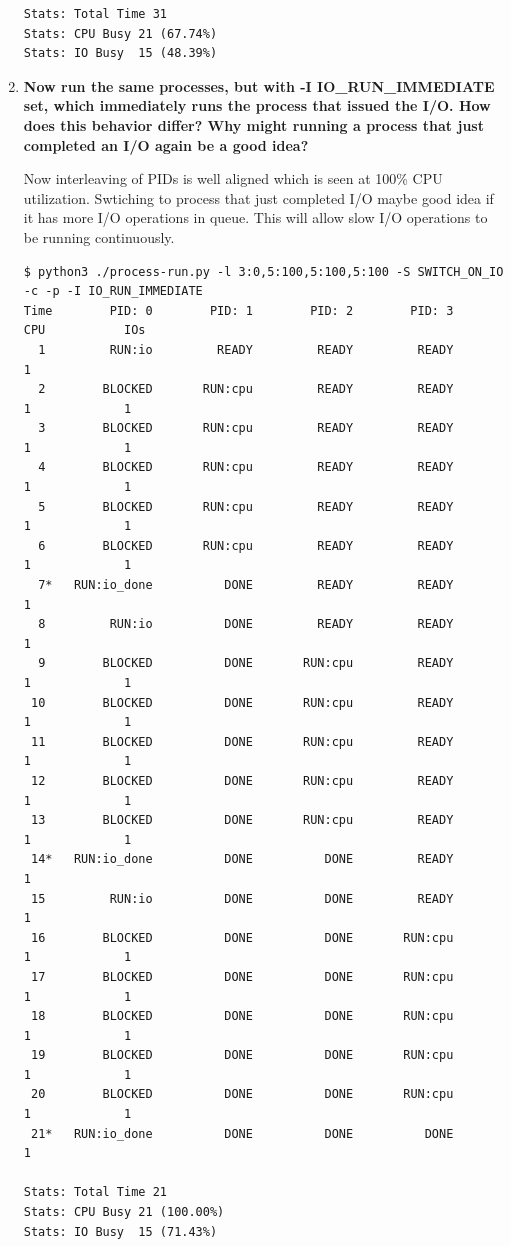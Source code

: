 \documentclass{article}
\begin{document}
\begin{enumerate}[label=\textbf{\arabic*}), start=3]
{\begin{verbatim}
Stats: Total Time 31
Stats: CPU Busy 21 (67.74%)
Stats: IO Busy  15 (48.39%)
    \end{verbatim}
    }
\pagebreak
    \item 
    {\bf Now run the same processes, but with
    -I IO\_RUN\_IMMEDIATE set, which immediately runs
    the process that issued the I/O. How does this behavior
    differ? Why might running a process that just completed
    an I/O again be a good idea?}

    Now interleaving of PIDs is well aligned which is seen at 100\% CPU
    utilization. Swtiching to process that just completed I/O maybe good
    idea if it has more I/O operations in queue. This will allow slow I/O
    operations to be running continuously.


{\scriptsize
\begin{verbatim}
$ python3 ./process-run.py -l 3:0,5:100,5:100,5:100 -S SWITCH_ON_IO -c -p -I IO_RUN_IMMEDIATE
Time        PID: 0        PID: 1        PID: 2        PID: 3           CPU           IOs
  1         RUN:io         READY         READY         READY             1          
  2        BLOCKED       RUN:cpu         READY         READY             1             1
  3        BLOCKED       RUN:cpu         READY         READY             1             1
  4        BLOCKED       RUN:cpu         READY         READY             1             1
  5        BLOCKED       RUN:cpu         READY         READY             1             1
  6        BLOCKED       RUN:cpu         READY         READY             1             1
  7*   RUN:io_done          DONE         READY         READY             1          
  8         RUN:io          DONE         READY         READY             1          
  9        BLOCKED          DONE       RUN:cpu         READY             1             1
 10        BLOCKED          DONE       RUN:cpu         READY             1             1
 11        BLOCKED          DONE       RUN:cpu         READY             1             1
 12        BLOCKED          DONE       RUN:cpu         READY             1             1
 13        BLOCKED          DONE       RUN:cpu         READY             1             1
 14*   RUN:io_done          DONE          DONE         READY             1          
 15         RUN:io          DONE          DONE         READY             1          
 16        BLOCKED          DONE          DONE       RUN:cpu             1             1
 17        BLOCKED          DONE          DONE       RUN:cpu             1             1
 18        BLOCKED          DONE          DONE       RUN:cpu             1             1
 19        BLOCKED          DONE          DONE       RUN:cpu             1             1
 20        BLOCKED          DONE          DONE       RUN:cpu             1             1
 21*   RUN:io_done          DONE          DONE          DONE             1          

Stats: Total Time 21
Stats: CPU Busy 21 (100.00%)
Stats: IO Busy  15 (71.43%)
\end{verbatim}
}
\end{enumerate}

\newpage


\end{document}
